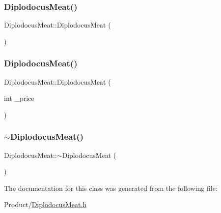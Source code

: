 \subsubsection{\texorpdfstring{DiplodocusMeat()}{DiplodocusMeat()}\hspace{0.1cm}{\footnotesize\ttfamily [1/2]}}
{\footnotesize\ttfamily Diplodocus\+Meat\+::\+Diplodocus\+Meat (\begin{DoxyParamCaption}{ }\end{DoxyParamCaption})}

\mbox{\label{classDiplodocusMeat_afac1940976cd4b135fa616a2a667784b}} 
\subsubsection{\texorpdfstring{DiplodocusMeat()}{DiplodocusMeat()}\hspace{0.1cm}{\footnotesize\ttfamily [2/2]}}
{\footnotesize\ttfamily Diplodocus\+Meat\+::\+Diplodocus\+Meat (\begin{DoxyParamCaption}\item[{int}]{\+\_\+price }\end{DoxyParamCaption})}

\mbox{\label{classDiplodocusMeat_a17edad25bea31e4014914578c5f1637a}} 
\subsubsection{\texorpdfstring{$\sim$DiplodocusMeat()}{~DiplodocusMeat()}}
{\footnotesize\ttfamily Diplodocus\+Meat\+::$\sim$\+Diplodocus\+Meat (\begin{DoxyParamCaption}{ }\end{DoxyParamCaption})}



The documentation for this class was generated from the following file\+:\begin{DoxyCompactItemize}
\item 
Product/\mbox{\hyperlink{DiplodocusMeat_8h}{Diplodocus\+Meat.\+h}}\end{DoxyCompactItemize}
